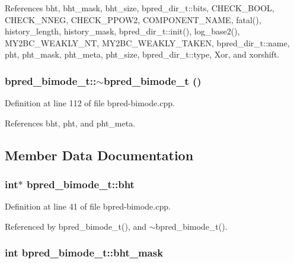 References bht, bht\_\-mask, bht\_\-size, bpred\_\-dir\_\-t::bits, CHECK\_\-BOOL, CHECK\_\-NNEG, CHECK\_\-PPOW2, COMPONENT\_\-NAME, fatal(), history\_\-length, history\_\-mask, bpred\_\-dir\_\-t::init(), log\_\-base2(), MY2BC\_\-WEAKLY\_\-NT, MY2BC\_\-WEAKLY\_\-TAKEN, bpred\_\-dir\_\-t::name, pht, pht\_\-mask, pht\_\-meta, pht\_\-size, bpred\_\-dir\_\-t::type, Xor, and xorshift.
\subsubsection[{$\sim$bpred\_\-bimode\_\-t}]{\setlength{\rightskip}{0pt plus 5cm}bpred\_\-bimode\_\-t::$\sim$bpred\_\-bimode\_\-t ()\hspace{0.3cm}{\tt  [inline]}}\label{classbpred__bimode__t_88da6f55a0fc5549a047ca0c85b042e5}




Definition at line 112 of file bpred-bimode.cpp.

References bht, pht, and pht\_\-meta.

\subsection{Member Data Documentation}
\subsubsection[{bht}]{\setlength{\rightskip}{0pt plus 5cm}int$\ast$ {\bf bpred\_\-bimode\_\-t::bht}\hspace{0.3cm}{\tt  [protected]}}\label{classbpred__bimode__t_0f36b672003c41550ee000c29992ca49}




Definition at line 41 of file bpred-bimode.cpp.

Referenced by bpred\_\-bimode\_\-t(), and $\sim$bpred\_\-bimode\_\-t().
\subsubsection[{bht\_\-mask}]{\setlength{\rightskip}{0pt plus 5cm}int {\bf bpred\_\-bimode\_\-t::bht\_\-mask}\hspace{0.3cm}{\tt  [protected]}}\label{classbpred__bimode__t_993842298bb7fe0d02e12a65996c6b72}




